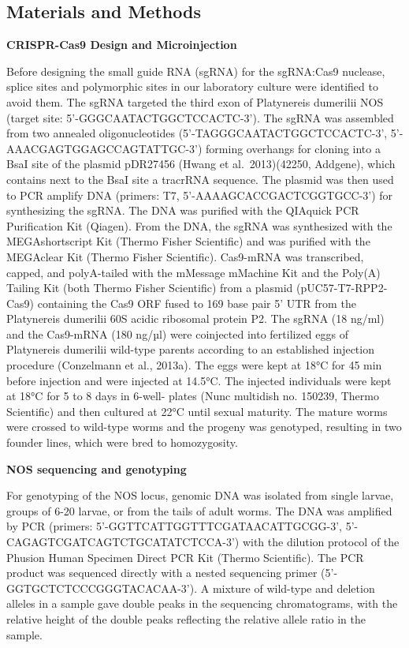 \documentclass[
  10pt,
  onecolumn]{article}
\begin{document}
\hypertarget{materials-and-methods}{%
\subsection{Materials and Methods}\label{materials-and-methods}}

\textbf{CRISPR-Cas9 Design and Microinjection}

Before designing the small guide RNA (sgRNA) for the sgRNA:Cas9
nuclease, splice sites and polymorphic sites in our laboratory culture
were identified to avoid them. The sgRNA targeted the third exon of
Platynereis dumerilii NOS (target site: 5'-GGGCAATACTGGCTCCACTC-3'). The
sgRNA was assembled from two annealed oligonucleotides
(5'-TAGGGCAATACTGGCTCCACTC-3', 5'-AAACGAGTGGAGCCAGTATTGC-3') forming
overhangs for cloning into a BsaI site of the plasmid pDR27456 (Hwang et
al.~2013)(42250, Addgene), which contains next to the BsaI site a
tracrRNA sequence. The plasmid was then used to PCR amplify DNA
(primers: T7, 5'-AAAAGCACCGACTCGGTGCC-3') for synthesizing the sgRNA.
The DNA was purified with the QIAquick PCR Purification Kit (Qiagen).
From the DNA, the sgRNA was synthesized with the MEGAshortscript Kit
(Thermo Fisher Scientific) and was purified with the MEGAclear Kit
(Thermo Fisher Scientific). Cas9-mRNA was transcribed, capped, and
polyA-tailed with the mMessage mMachine Kit and the Poly(A) Tailing Kit
(both Thermo Fisher Scientific) from a plasmid (pUC57-T7-RPP2-Cas9)
containing the Cas9 ORF fused to 169 base pair 5' UTR from the
Platynereis dumerilii 60S acidic ribosomal protein P2. The sgRNA (18
ng/ml) and the Cas9-mRNA (180 ng/µl) were coinjected into fertilized
eggs of Platynereis dumerilii wild-type parents according to an
established injection procedure (Conzelmann et al., 2013a). The eggs
were kept at 18°C for 45 min before injection and were injected at
14.5°C. The injected individuals were kept at 18°C for 5 to 8 days in
6-well- plates (Nunc multidish no. 150239, Thermo Scientific) and then
cultured at 22°C until sexual maturity. The mature worms were crossed to
wild-type worms and the progeny was genotyped, resulting in two founder
lines, which were bred to homozygosity.

\textbf{NOS sequencing and genotyping}

For genotyping of the NOS locus, genomic DNA was isolated from single
larvae, groups of 6-20 larvae, or from the tails of adult worms. The DNA
was amplified by PCR (primers: 5'-GGTTCATTGGTTTCGATAACATTGCGG-3',
5'-CAGAGTCGATCAGTCTGCATATCTCCA-3') with the dilution protocol of the
Phusion Human Specimen Direct PCR Kit (Thermo Scientific). The PCR
product was sequenced directly with a nested sequencing primer
(5'-GGTGCTCTCCCGGGTACACAA-3'). A mixture of wild-type and deletion
alleles in a sample gave double peaks in the sequencing chromatograms,
with the relative height of the double peaks reflecting the relative
allele ratio in the sample.
\end{document}
